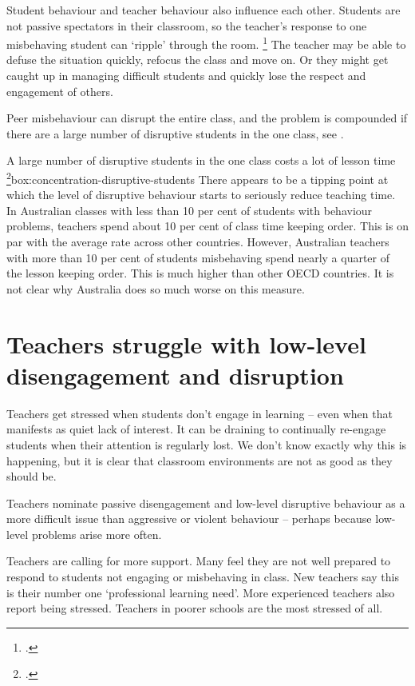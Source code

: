 \documentclass[FrontPage]{grattan}
\begin{document}
Student behaviour and teacher behaviour also influence each other. Students are not passive spectators in their classroom, so the teacher's response to one misbehaving student can `ripple' through the room.%
\footcite{Kounin1958RippleEffectDiscipline}
The teacher may be able to defuse the situation quickly, refocus the class and move on. Or they might get caught up in managing difficult students and quickly lose the respect and engagement of others.

Peer misbehaviour can disrupt the entire class, and the problem is compounded if there are a large number of disruptive students in the one class, see .

\vfill
\begin{smallbox}{A large number of disruptive students in the one class costs a lot of lesson time%
\footcite[][Table 6.7]{Freeman2014AustralianTeachersLearning}}{box:concentration-disruptive-students}
There appears to be a tipping point at which the level of disruptive behaviour starts to seriously reduce teaching time. In Australian classes with less than 10 per cent of students with behaviour problems, teachers spend about 10 per cent of class time keeping order. This is on par with the average rate across other countries. However, Australian teachers with more than 10 per cent of students misbehaving spend nearly a quarter of the lesson keeping order. This is much higher than other OECD countries. It is not clear why Australia does so much worse on this measure.
\end{smallbox}


\chapter{Teachers struggle with low-level disengagement and disruption }\label{chap:teachers-struggle}
Teachers get stressed when students don't engage in learning -- even when that manifests as quiet lack of interest. It can be draining to continually re-engage students when their attention is regularly lost. We don't know exactly why this is happening, but it is clear that classroom environments are not as good as they should be. 
 
Teachers nominate passive disengagement and low-level disruptive behaviour as a more difficult issue than aggressive or violent behaviour -- perhaps because low-level problems arise more often.
 
Teachers are calling for more support. Many feel they are not well prepared to respond to students not engaging or misbehaving in class. New teachers say this is their number one `professional learning need'. More experienced teachers also report being stressed. Teachers in poorer schools are the most stressed of all.
 
\end{document}

